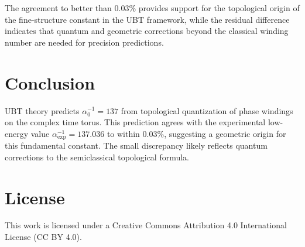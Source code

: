 \documentclass[12pt, a4paper]{article}
\begin{document}
The agreement to better than $0.03\%$ provides support for the topological origin of the fine-structure constant in the UBT framework, while the residual difference indicates that quantum and geometric corrections beyond the classical winding number are needed for precision predictions.

\section{Conclusion}

UBT theory predicts $\alpha_0^{-1} = 137$ from topological quantization of phase windings on the complex time torus. This prediction agrees with the experimental low-energy value $\alpha_{\text{exp}}^{-1} = 137.036$ to within $0.03\%$, suggesting a geometric origin for this fundamental constant. The small discrepancy likely reflects quantum corrections to the semiclassical topological formula.


\section*{License}
This work is licensed under a Creative Commons Attribution 4.0 International License (CC BY 4.0).
\end{document}
